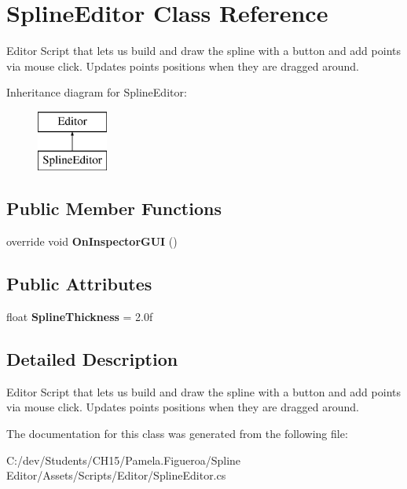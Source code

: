 \hypertarget{class_spline_editor}{}\section{Spline\+Editor Class Reference}
\label{class_spline_editor}


Editor Script that lets us build and draw the spline with a button and add points via mouse click. Updates points\textquotesingle{} positions when they are dragged around.  


Inheritance diagram for Spline\+Editor\+:\begin{figure}[H]
\begin{center}
\leavevmode
\includegraphics[height=2.000000cm]{class_spline_editor}
\end{center}
\end{figure}
\subsection*{Public Member Functions}
\begin{DoxyCompactItemize}
\item 
\mbox{\label{class_spline_editor_af82ef90e17490985629bc79ef10f5795}} 
override void {\bfseries On\+Inspector\+G\+UI} ()
\end{DoxyCompactItemize}
\subsection*{Public Attributes}
\begin{DoxyCompactItemize}
\item 
\mbox{\label{class_spline_editor_a89c507ae57d50b718d38af7e7c3f9918}} 
float {\bfseries Spline\+Thickness} = 2.\+0f
\end{DoxyCompactItemize}


\subsection{Detailed Description}
Editor Script that lets us build and draw the spline with a button and add points via mouse click. Updates points\textquotesingle{} positions when they are dragged around. 



The documentation for this class was generated from the following file\+:\begin{DoxyCompactItemize}
\item 
C\+:/dev/\+Students/\+C\+H15/\+Pamela.\+Figueroa/\+Spline Editor/\+Assets/\+Scripts/\+Editor/Spline\+Editor.\+cs\end{DoxyCompactItemize}
